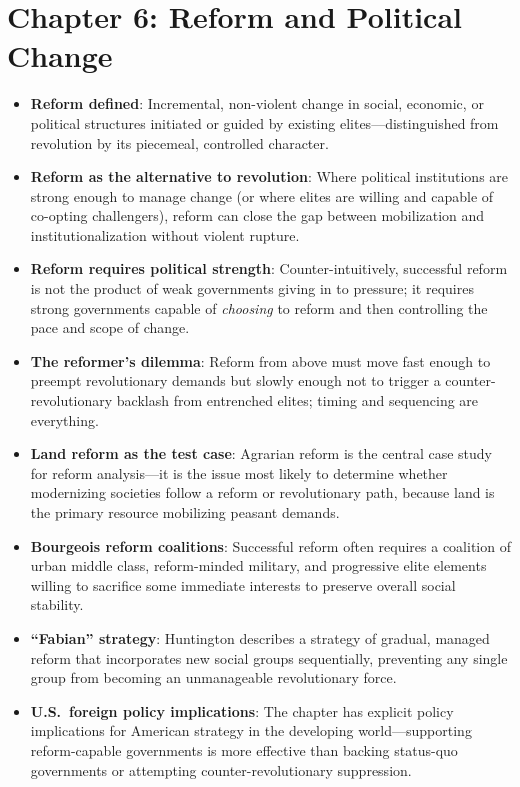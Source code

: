 \documentclass[12pt]{article}
\begin{document}
\section{Chapter 6: Reform and Political Change}

\begin{itemize}[leftmargin=*, itemsep=4pt]
    \item \textbf{Reform defined}: Incremental, non-violent change in social, economic, or political structures initiated or guided by existing elites---distinguished from revolution by its piecemeal, controlled character.
    \item \textbf{Reform as the alternative to revolution}: Where political institutions are strong enough to manage change (or where elites are willing and capable of co-opting challengers), reform can close the gap between mobilization and institutionalization without violent rupture.
    \item \textbf{Reform requires political strength}: Counter-intuitively, successful reform is not the product of weak governments giving in to pressure; it requires strong governments capable of \emph{choosing} to reform and then controlling the pace and scope of change.
    \item \textbf{The reformer's dilemma}: Reform from above must move fast enough to preempt revolutionary demands but slowly enough not to trigger a counter-revolutionary backlash from entrenched elites; timing and sequencing are everything.
    \item \textbf{Land reform as the test case}: Agrarian reform is the central case study for reform analysis---it is the issue most likely to determine whether modernizing societies follow a reform or revolutionary path, because land is the primary resource mobilizing peasant demands.
    \item \textbf{Bourgeois reform coalitions}: Successful reform often requires a coalition of urban middle class, reform-minded military, and progressive elite elements willing to sacrifice some immediate interests to preserve overall social stability.
    \item \textbf{``Fabian'' strategy}: Huntington describes a strategy of gradual, managed reform that incorporates new social groups sequentially, preventing any single group from becoming an unmanageable revolutionary force.
    \item \textbf{U.S.\ foreign policy implications}: The chapter has explicit policy implications for American strategy in the developing world---supporting reform-capable governments is more effective than backing status-quo governments or attempting counter-revolutionary suppression.

\end{itemize}
\end{document}
